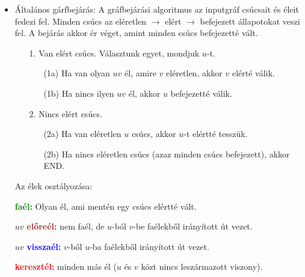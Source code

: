 \documentclass[../../szobeli.tex]{subfiles}
\begin{document}
\begin{center}
    \noindent{}
\end{center}

    \begin{itemize}
        \item Általános gárfbejárás: A gráfbejárási algoritmus az inputgráf csúcsait és éleit fedezi fel. Minden csúcs az eléretlen $\rightarrow$ elért $\rightarrow$ befejezett állapotokat veszi fel. A bejárás akkor ér véget, amint minden csúcs befejezetté vált. 
            \begin{itemize}
                \item[1.] Van elért csúcs. Választunk egyet, mondjuk $u$-t. \begin{itemize}
                    \item[(1a)] Ha van olyan $uv$ él, amire $v$ eléretlen, akkor $v$ elérté válik.
                    \item[(1b)] Ha nincs ilyen $uv$ él, akkor $u$ befejezetté válik.
                \end{itemize}
                \item[2.] Nincs elért csúcs. \begin{itemize}
                    \item[(2a)] Ha van eléretlen $u$ csúcs, akkor $u$-t elértté tesszük.
                    \item[(2b)] Ha nincs eléretlen csúcs (azaz minden csúcs befejezett), akkor END.
                \end{itemize} 
            \end{itemize}

            Az élek osztályozása:

                \textbf{\textcolor{green}{faél:}} Olyan él, ami mentén egy csúcs elértté vált.

                $uv$ \textbf{\textcolor{brown}{előreél:}} nem faél, de $u$-ból $v$-be faélekből irányított út vezet.

                $uv$ \textbf{\textcolor{blue}{visszaél:}} $v$-ből $u$-ba faélekből irányított út vezet.

                \textbf{\textcolor{red}{keresztél:}} minden más él ($u$ és $v$ közt nincs leszármazott viszony).



\end{itemize}
\end{document}
